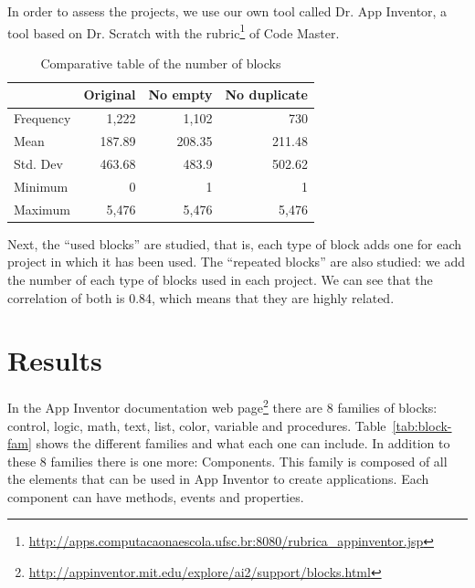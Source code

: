 \documentclass[a4paper]{article}
\begin{document}
In order to assess the projects, we use our own tool called Dr. App Inventor, a tool based on Dr. Scratch with the 
rubric\footnote{\url{http://apps.computacaonaescola.ufsc.br:8080/rubrica_appinventor.jsp}} of Code Master.


\begin{table}[ht]
\begin{center}
\caption{Comparative table of the number of blocks}

\bigskip

\begin{tabular}{|l|r|r|r|}
\hline
& Original & No empty & No duplicate \\ \hline
Frequency & 1,222 & 1,102 & 730\\ \hline
Mean & 187.89 & 208.35 & 211.48\\ \hline
Std. Dev & 463.68 & 483.9 & 502.62 \\ \hline
Minimum & 0 & 1 & 1\\ \hline
Maximum & 5,476 & 5,476 & 5,476 \\ \hline
\end{tabular}
\end{center}
\end{table}

Next, the ``used blocks'' are studied, that is, each type of block adds one for each project in which it has been used. The ``repeated blocks'' are also studied: we add the number of each type of blocks used in each project. We can see that the correlation of both is 0.84, which means that they are highly related.

\section{Results}

In the App Inventor documentation web page\footnote{\url{http://appinventor.mit.edu/explore/ai2/support/blocks.html}} there are 8 families of blocks: control, logic, math, text, list, color, variable and procedures. Table~\ref{tab:block-fam} shows the different families and what each one can include. In addition to these 8 families there is one more: Components. This family is composed of all the elements that can be used in App Inventor to create applications. Each component can have methods, events and properties.
\end{document}
